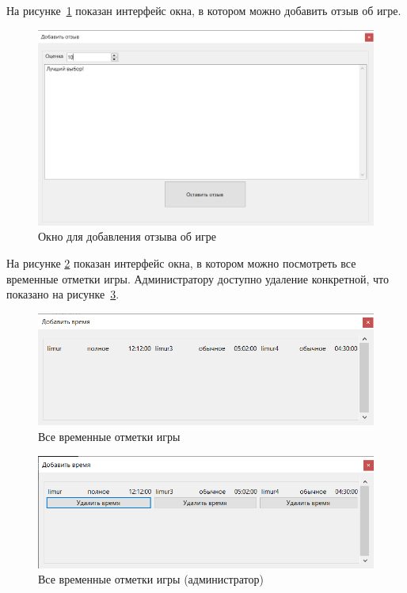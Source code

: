 На рисунке~\ref{img:addReview} показан интерфейс окна, в котором можно добавить отзыв об игре. 

\begin{figure}[H]
	\begin{center}
		\includegraphics[scale=0.7]{../imgs/interface/addReview.png}
	\end{center}
	\captionsetup{justification=centering}
	\caption{Окно для добавления отзыва об игре}
	\label{img:addReview}
\end{figure}

На рисунке \ref{img:allTimeRecordU} показан интерфейс окна, в котором можно посмотреть все временные отметки игры. Администратору доступно удаление конкретной, что показано на рисунке~\ref{img:allTimeRecordA}.

\clearpage
\begin{figure}[H]
	\begin{center}
		\includegraphics[scale=0.8]{../imgs/interface/AllTimeRecordsU.png}
	\end{center}
	\captionsetup{justification=centering}
	\caption{Все временные отметки игры}
	\label{img:allTimeRecordU}
\end{figure}

\begin{figure}[H]
	\begin{center}
		\includegraphics[scale=0.8]{../imgs/interface/AllTimeRecordsA.png}
	\end{center}
	\captionsetup{justification=centering}
	\caption{Все временные отметки игры (администратор)}
	\label{img:allTimeRecordA}
\end{figure}

